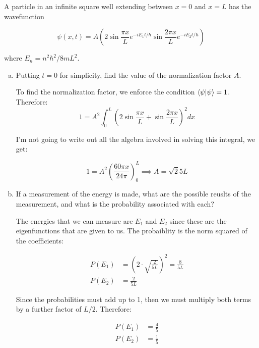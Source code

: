 \documentclass[10pt]{article}
\begin{document}
    A particle in an infinite square well extending between $x = 0$ and $x = L$ has the wavefunction

    \[ \psi(x, t) = A\left( 2 \sin \frac{\pi x}{L}e^{-iE_1t/\hbar} \sin \frac{2\pi x}{L}e^{-iE_2t/\hbar}\right)\]

    where $E_n = n^2\hbar^2/8mL^2$. 

    \begin{enumerate}[(a)]
        \item Putting $t = 0$ for simplicity, find the value of the normalization factor $A$. 
        
        \begin{solution}
            To find the normalization factor, we enforce the condition $\braket{\psi}{\psi} = 1$. Therefore: 
            \[ 1 = A^2 \int_0^L \left(2 \sin \frac{\pi x}{L} + \sin \frac{2\pi x}{L}\right)^2 dx\] 

            I'm not going to write out all the algebra involved in solving this integral, we get: 

            \[ 1 = A^2 \left(\frac{60 \pi x}{24 \pi}\right)_0^L \implies A = \sqrt{2}{5L}\] 
        \end{solution}


        \item If a measurement of the energy is made, what are the possible reuslts of the measurement, and what is the probability associated with each? 
        
        \begin{solution}
            The energies that we can measure are $E_1$ and $E_2$ since these are the eigenfunctions that are given to us. The probaiblity is the norm squared of the coefficients: 

            \begin{align*}
                P(E_1) &= \left(2 \cdot \sqrt{\frac{2}{5L}}\right)^2 = \frac{8}{5L}\\
                P(E_2) &= \frac{2}{5L}
            \end{align*}

            Since the probabilities must add up to 1, then we must multiply both terms by a further factor of $L/2$. Therefore: 

            \begin{align*}
                P(E_1) &= \frac{4}{5}\\
                P(E_2) &= \frac 15
            \end{align*}
        \end{solution}


\end{enumerate}
\end{document}

